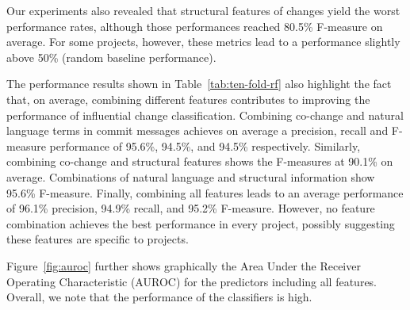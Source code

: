Our experiments also revealed that structural features of changes yield the
worst performance rates, although those performances reached 80.5\%
F-measure on average. For some projects, however, these metrics lead to a
performance slightly above 50\% (random baseline performance).


The performance results shown in Table~\ref{tab:ten-fold-rf} also highlight
the fact that, on average, combining different features contributes to improving
the performance of influential change classification. Combining co-change and
natural language terms in commit messages achieves on average a precision, recall and
F-measure performance of 95.6\%, 94.5\%, and 94.5\% respectively.
Similarly, combining co-change and structural features shows the F-measures at
90.1\% on average. Combinations of natural language and structural information
show 95.6\% F-measure. Finally, combining all features leads to an average
performance of 96.1\% precision, 94.9\% recall, and 95.2\% F-measure. However,
no feature combination achieves the best performance in every project, possibly
suggesting these features are specific to projects.

Figure~\ref{fig:auroc} further shows graphically the Area Under the Receiver Operating Characteristic (AUROC) for the predictors including all features. Overall, we note that the performance of the classifiers is high.


